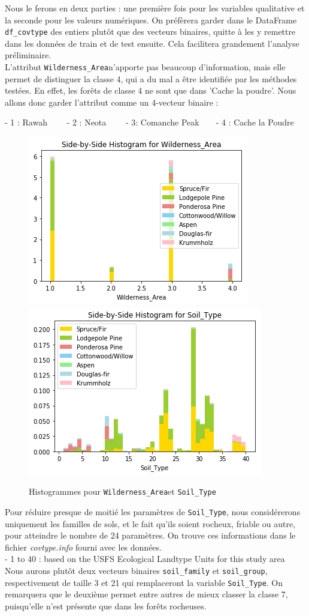 \documentclass[12pt,a4paper]{article}
\numberwithin{equation}{section}
\newcommand{\wilderness}{\texttt{Wilderness\_Area}}
\newcommand{\soil}{\texttt{Soil\_Type}}
\begin{document}
	Nous le ferons en deux parties : une première fois pour les variables qualitative et la seconde pour les valeurs numériques. On préfèrera garder dans le DataFrame \verb!df_covtype! des entiers plutôt que des vecteurs binaires, quitte à les y remettre dans les données de train et de test ensuite. Cela facilitera grandement l'analyse préliminaire.\\
	
	L'attribut \wilderness n'apporte pas beaucoup d'information, mais elle permet de distinguer la classe 4, qui a du mal a être identifiée par les méthodes testées. En effet, les forêts de classe 4 ne sont que dans 'Cache la poudre'. Nous allons donc garder l'attribut comme un 4-vecteur binaire : 
	
	- 1 : Rawah \ \ \ \ - 2 : Neota  \ \ \ \ - 3: Comanche Peak\ \ \ \ - 4 : Cache la Poudre  
	
	\begin{figure}[h]
		\centering
		\hfill
		\includegraphics[width=0.35\linewidth]{img/wilderness_hist}
		\hfill
		\includegraphics[width=0.35\linewidth]{img/soil_hist}
		\hfill
		\label{fig:wildernesssoilhist}
		\caption{Histogrammes pour \wilderness et \soil}
	\end{figure}
	
	Pour réduire presque de moitié les paramètres de \soil, nous considérerons uniquement les familles de sols, et le fait qu'ils soient rocheux, friable ou autre, pour atteindre le nombre de 24 paramètres. On trouve ces informations dans le fichier \textit{covtype.info} fourni avec les données.\\
	
	-  1 to 40 : based on the USFS Ecological Landtype Units for this study area\\
	
	Nous aurons plutôt deux vecteurs binaires \texttt{soil\_family} et \texttt{soil\_group}, respectivement de taille 3 et 21 qui remplaceront la variable \soil. On remarquera que le deuxième permet entre autres de mieux classer la classe 7, puisqu'elle n'est présente que dans les forêts rocheuses.
	
\end{document}
